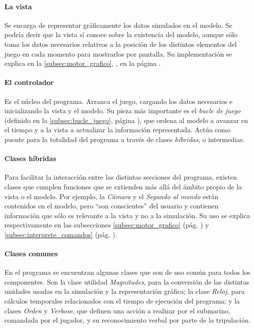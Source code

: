 \documentclass[a4paper,
	11pt,
	parskip=full,
	bibliography=totoc,
	twoside
	]{scrartcl}
\begin{document}
		\paragraph{La vista}
			Se encarga de representar gráficamente los datos simulados en el modelo. Se podría decir que la vista sí conoce sobre la existencia del modelo, aunque sólo toma los datos necesarios relativos a la posición de los distintos elementos del juego en cada momento para mostrarlos por pantalla. Su implementación se explica en la \autoref{subsec:motor_grafico}, , en la página \pageref{subsec:motor_grafico}.
			
		\paragraph{El controlador}
			Es el núcleo del programa. Arranca el juego, cargando los datos necesarios e inicializando la vista y el modelo. Su pieza más importante es el \textit{bucle de juego} (definido en la \autoref{subsec:bucle_juego}, página \pageref{subsec:bucle_juego}), que ordena al modelo a avanzar en el tiempo y a la vista a actualizar la información representada. Actúa como puente para la totalidad del programa a través de clases \textit{híbridas}, o intermedias.
			
		\paragraph{Clases híbridas}
			Para facilitar la interacción entre las distintas secciones del programa, existen clases que cumplen funciones que se extienden más allá del ámbito propio de la vista o el modelo. Por ejemplo, la \textit{Cámara} y el \textit{Segundo al mando} están contenidos en el modelo, pero ``son conscientes'' del usuario y contienen información que sólo es relevante a la vista y no a la simulación.  Su uso se explica respectivamente en las subsecciones \ref{subsec:motor_grafico}  (pág. \pageref{subsec:motor_grafico}) y \ref{subsec:interprete_comandos}  (pág. \pageref{subsec:interprete_comandos}).
			
		\paragraph{Clases comunes}
			En el programa se encuentran algunas clases que son de uso común para todos los componentes. Son la clase utilidad \textit{Magnitudes}, para la conversión de las distintas unidades usadas en la simulación y la representación gráfica; la clase \textit{Reloj}, para cálculos temporales relacionados con el tiempo de ejecución del programa; y la clases \textit{Orden} y \textit{Verbose}, que definen una acción a realizar por el submarino, comandada por el jugador, y su reconocimiento verbal por parte de la tripulación.
			
\end{document}

